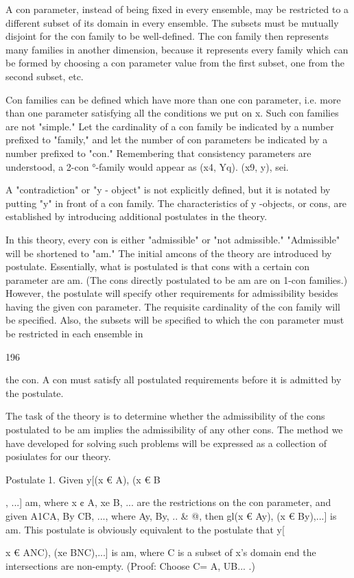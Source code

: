 \documentclass[10pt,twoside]{memoir}
\begin{document}
\begin{enumerate}
{\begin{enumerate}
\begin{sysrules}
\begin{sysrules}
\begin{sysrules}
\begin{sysrules}
{\begin{enumerate}
{{{{{{{{{{A con parameter, instead of being fixed in every ensemble, may be 
restricted to a different subset of its domain in every ensemble. The subsets 
must be mutually disjoint for the con family to be well-defined. The con 
family then represents many families in another dimension, because it 
represents every family which can be formed by choosing a con parameter 
value from the first subset, one from the second subset, etc. 

Con families can be defined which have more than one con parameter, 
i.e. more than one parameter satisfying all the conditions we put on x. Such 
con families are not "simple." Let the cardinality of a con family be 
indicated by a number prefixed to "family," and let the number of con 
parameters be indicated by a number prefixed to "con." Remembering that 
consistency parameters are understood, a 2-con °-family would appear as 
(x4, Yq). (x9, y), sei. 

A "contradiction" or "y - object" is not explicitly defined, but it is 
notated by putting "y" in front of a con family. The characteristics of y 
-objects, or cons, are established by introducing additional postulates in the 
theory. 

In this theory, every con is either "admissible" or "not admissible." 
"Admissible" will be shortened to "am." The initial amcons of the theory 
are introduced by postulate. Essentially, what is postulated is that cons with 
a certain con parameter are am. (The cons directly postulated to be am are 
on 1-con families.) However, the postulate will specify other requirements for 
admissibility besides having the given con parameter. The requisite 
cardinality of the con family will be specified. Also, the subsets will be 
specified to which the con parameter must be restricted in each ensemble in 


196 


the con. A con must satisfy all postulated requirements before it is admitted 
by the postulate. 

The task of the theory is to determine whether the admissibility of the 
cons postulated to be am implies the admissibility of any other cons. The 
method we have developed for solving such problems will be expressed as a 
collection of posiulates for our theory. 

Postulate 1. Given y[(x € A), (x € B}, ...] am, where x ¢ A, xe B, ... are the 
restrictions on the con parameter, and given A1CA, By CB, ..., where Ay, By, 
.. & @, then gl(x € Ay), (x € By),...] is am. This postulate is obviously 
equivalent to the postulate that y[{x € ANC), (xe BNC),...] is am, where C is 
a subset of x's domain end the intersections are non-empty. (Proof: Choose 
C= A, UB... .) 

}}}}}}}}}}
\end{enumerate}}
\end{sysrules}
\end{sysrules}
\end{sysrules}
\end{sysrules}
\end{enumerate}}
\end{enumerate}
\end{document}
